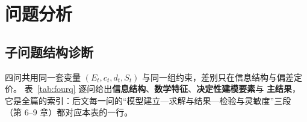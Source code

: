
\section{问题分析}\label{chap:analysis}

\subsection{子问题结构诊断}

四问共用同一套变量 \((E_t,c_t,d_t,S_t)\) 与同一组约束，差别只在信息结构与偏差定价。
表~\ref{tab:fourq} 逐问给出\textbf{信息结构}、\textbf{数学特征}、\textbf{决定性建模要素}与
\textbf{主结果}，它是全篇的索引：后文每一问的“模型建立—求解与结果—检验与灵敏度”三段
（第 6--9 章）都对应本表的一行。

